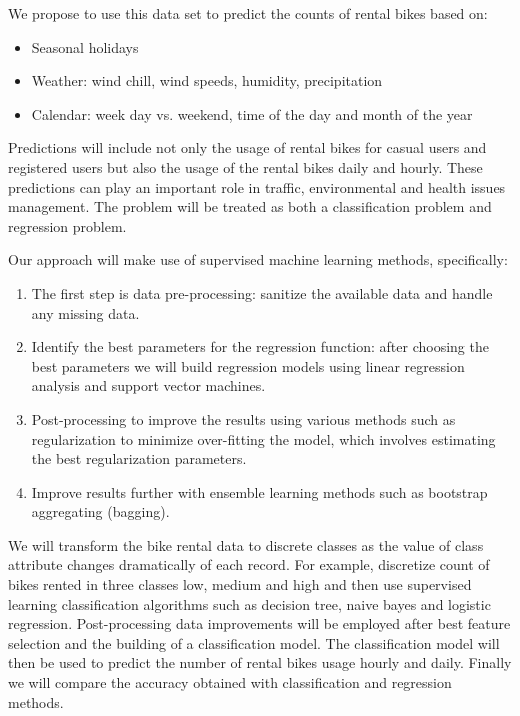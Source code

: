 \documentclass[12pt]{article}
\newcommand{\ci}[1]{\cite{#1}}
\begin{document}
We propose to use this data set to predict the counts of rental bikes based on:

\begin{itemize}
\item Seasonal holidays
\item Weather: wind chill, wind speeds, humidity, precipitation
\item Calendar: week day vs. weekend, time of the day and month of the
      year
\end{itemize}

Predictions will include not only the usage of rental bikes for casual users
and registered users but also the usage of the rental bikes daily and
hourly. These predictions can play an important role in traffic, environmental
and health issues management.  The problem will be treated as both a
classification problem and regression problem.

Our approach will make use of supervised machine learning methods,
specifically:

\begin{enumerate}
\item The first step is data pre-processing: sanitize the available
      data and handle any missing data.

\item Identify the best parameters for the regression function: after choosing
      the best parameters we will build regression models using linear
      regression analysis and support vector machines\ci{svm}.

\item Post-processing to improve the results using various methods such as
      regularization to minimize over-fitting the model, which involves
      estimating the best regularization parameters.

\item Improve results further with ensemble learning methods such as bootstrap
      aggregating (bagging).
\end{enumerate}

We will transform the bike rental data to discrete classes as the value of
class attribute changes dramatically of each record.  For example, discretize 
count of bikes rented in three classes low, medium and high and then use 
supervised learning classification algorithms such as decision tree, naive
bayes and logistic regression\ci{logreg}.  Post-processing data improvements
will be employed after best feature selection and the building of a
classification model.  The classification model will then be used to predict
the number of rental bikes usage hourly and daily. Finally we will compare the accuracy obtained 
with classification and regression methods.
\end{document}
